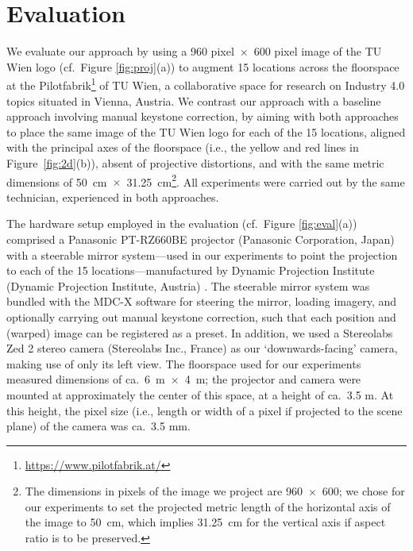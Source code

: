 \documentclass[review]{elsarticle}
\begin{document}
\section{Evaluation}

We evaluate our approach by using a 960 pixel~$\times$~600 pixel image of the TU Wien logo (cf.\ Figure \ref{fig:proj}(a)) to augment 15 locations across the floorspace at the Pilotfabrik\footnote{\url{https://www.pilotfabrik.at/}} of TU Wien, a collaborative space for research on Industry 4.0 topics situated in Vienna, Austria. We contrast our approach with a baseline approach involving manual keystone correction, by aiming with both approaches to place the same image of the TU Wien logo for each of the 15 locations, aligned with the principal axes of the floorspace (i.e., the yellow and red lines in Figure~\ref{fig:2d}(b)), absent of projective distortions, and with the same metric dimensions of 50~cm~$\times$~31.25~cm\footnote{The dimensions in pixels of the image we project are 960~$\times$~600; we chose for our experiments to set the projected metric length of the horizontal axis of the image to 50~cm, which implies 31.25~cm for the vertical axis if aspect ratio is to be preserved.}. All experiments were carried out by the same technician, experienced in both approaches.

The hardware setup employed in the evaluation (cf.\ Figure \ref{fig:eval}(a)) comprised a Panasonic PT-RZ660BE projector (Panasonic Corporation, Japan) with a steerable mirror system---used in our experiments to point the projection to each of the 15 locations---manufactured by Dynamic Projection Institute (Dynamic Projection Institute, Austria) \cite{rupprecht2020information,Rupprecht2021}. The steerable mirror system was bundled with the MDC-X software for steering the mirror, loading imagery, and optionally carrying out manual keystone correction, such that each position and (warped) image can be registered as a preset. In addition, we used a Stereolabs Zed 2 stereo camera (Stereolabs Inc., France) as our `downwards-facing' camera, making use of only its left view. The floorspace used for our experiments measured dimensions of ca.\ 6~m~$\times$~4~m; the projector and camera were mounted at approximately the center of this space, at a height of ca.\ 3.5 m. At this height, the pixel size (i.e., length or width of a pixel if projected to the scene plane) of the camera was ca.\ 3.5 mm.
\end{document}

